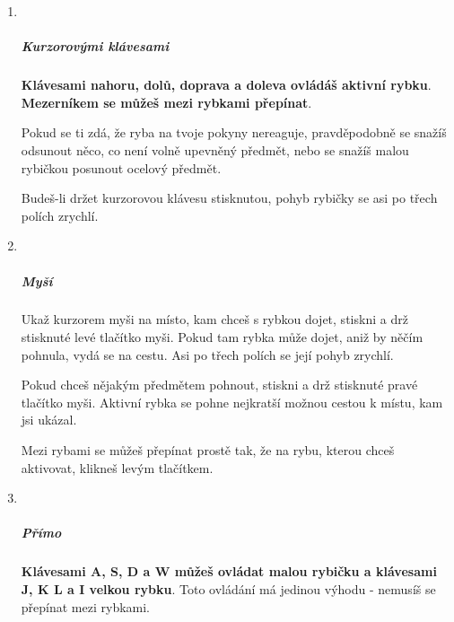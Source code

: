 \begin{enumerate}
\item ~
  \hypertarget{kurzorovuxfdmi-kluxe1vesami}{%
  \subparagraph{Kurzorovými
  klávesami}\label{kurzorovuxfdmi-kluxe1vesami}}

  \textbf{Klávesami nahoru, dolů, doprava a doleva ovládáš aktivní
  rybku}. \textbf{Mezerníkem se můžeš mezi rybkami přepínat}.

  Pokud se ti zdá, že ryba na tvoje pokyny nereaguje, pravděpodobně se
  snažíš odsunout něco, co není volně upevněný předmět, nebo se snažíš
  malou rybičkou posunout ocelový předmět.

  Budeš-li držet kurzorovou klávesu stisknutou, pohyb rybičky se asi po
  třech polích zrychlí.
\item ~
  \hypertarget{myux161uxed}{%
  \subparagraph{Myší}\label{myux161uxed}}

  Ukaž kurzorem myši na místo, kam chceš s rybkou dojet, stiskni a drž
  stisknuté levé tlačítko myši. Pokud tam rybka může dojet, aniž by
  něčím pohnula, vydá se na cestu. Asi po třech polích se její pohyb
  zrychlí.

  Pokud chceš nějakým předmětem pohnout, stiskni a drž stisknuté pravé
  tlačítko myši. Aktivní rybka se pohne nejkratší možnou cestou k místu,
  kam jsi ukázal.

  Mezi rybami se můžeš přepínat prostě tak, že na rybu, kterou chceš
  aktivovat, klikneš levým tlačítkem.
\item ~
  \hypertarget{pux159uxedmo}{%
  \subparagraph{Přímo}\label{pux159uxedmo}}

  \textbf{Klávesami A, S, D a W můžeš ovládat malou rybičku a klávesami
  J, K L a I velkou rybku}. Toto ovládání má jedinou výhodu - nemusíš se
  přepínat mezi rybkami.
\end{enumerate}
